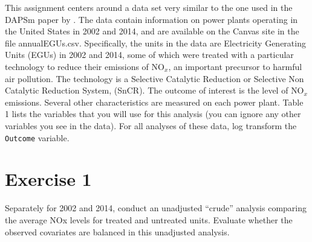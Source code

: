 \begin{quoting}
  This assignment centers around a data set very similar to the one
  used in the DAPSm paper by \cite{papadogeorgou2018adjusting}. The
  data contain information on power plants operating in the United
  States in 2002 and 2014, and are available on the Canvas site in the
  file annualEGUs.csv. Specifically, the units in the data are
  Electricity Generating Units (EGUs) in 2002 and 2014, some of which
  were treated with a particular technology to reduce their emissions
  of $\text{NO}_x$, an important precursor to harmful air
  pollution. The technology is a Selective Catalytic Reduction or
  Selective Non Catalytic Reduction System, (SnCR). The outcome of
  interest is the level of $\text{NO}_x$ emissions. Several other
  characteristics are measured on each power plant. Table 1 lists the
  variables that you will use for this analysis (you can ignore any
  other variables you see in the data). For all analyses of these
  data, log transform the \texttt{Outcome} variable.
\end{quoting}

\section{Exercise 1}

\begin{quoting}
  Separately for 2002 and 2014, conduct an unadjusted “crude” analysis
  comparing the average NOx levels for treated and untreated
  units. Evaluate whether the observed covariates are balanced in this
  unadjusted analysis.
\end{quoting}


